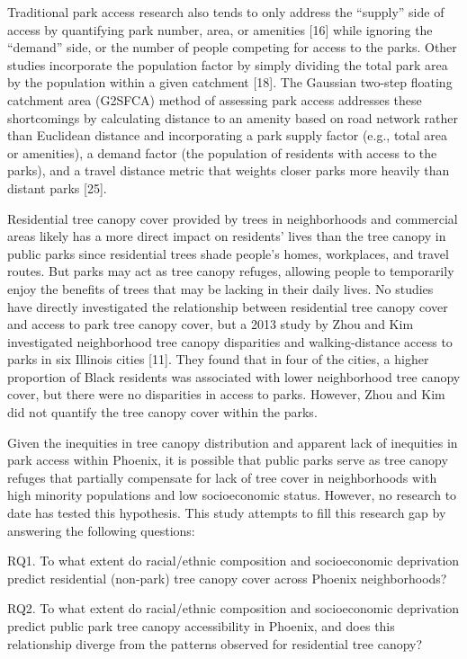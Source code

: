 \documentclass[
  sn-basic,
]{sn-jnl}
\begin{document}
Traditional park access research also tends to only address the
``supply'' side of access by quantifying park number, area, or amenities
{[}16{]} while ignoring the ``demand'' side, or the number of people
competing for access to the parks. Other studies incorporate the
population factor by simply dividing the total park area by the
population within a given catchment {[}18{]}. The Gaussian two-step
floating catchment area (G2SFCA) method of assessing park access
addresses these shortcomings by calculating distance to an amenity based
on road network rather than Euclidean distance and incorporating a park
supply factor (e.g., total area or amenities), a demand factor (the
population of residents with access to the parks), and a travel distance
metric that weights closer parks more heavily than distant parks
{[}25{]}.

Residential tree canopy cover provided by trees in neighborhoods and
commercial areas likely has a more direct impact on residents' lives
than the tree canopy in public parks since residential trees shade
people's homes, workplaces, and travel routes. But parks may act as tree
canopy refuges, allowing people to temporarily enjoy the benefits of
trees that may be lacking in their daily lives. No studies have directly
investigated the relationship between residential tree canopy cover and
access to park tree canopy cover, but a 2013 study by Zhou and Kim
investigated neighborhood tree canopy disparities and walking-distance
access to parks in six Illinois cities {[}11{]}. They found that in four
of the cities, a higher proportion of Black residents was associated
with lower neighborhood tree canopy cover, but there were no disparities
in access to parks. However, Zhou and Kim did not quantify the tree
canopy cover within the parks.

Given the inequities in tree canopy distribution and apparent lack of
inequities in park access within Phoenix, it is possible that public
parks serve as tree canopy refuges that partially compensate for lack of
tree cover in neighborhoods with high minority populations and low
socioeconomic status. However, no research to date has tested this
hypothesis. This study attempts to fill this research gap by answering
the following questions:

RQ1. To what extent do racial/ethnic composition and socioeconomic
deprivation predict residential (non-park) tree canopy cover across
Phoenix neighborhoods?

RQ2. To what extent do racial/ethnic composition and socioeconomic
deprivation predict public park tree canopy accessibility in Phoenix,
and does this relationship diverge from the patterns observed for
residential tree canopy?
\end{document}
